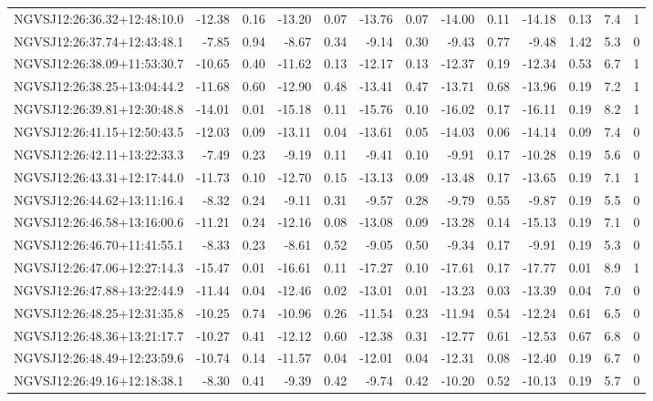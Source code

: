 \begin{tabular}{lrrrrrrrrrrcc}
NGVSJ12:26:36.32+12:48:10.0 & -12.38 & 0.16 & -13.20 & 0.07 & -13.76 & 0.07 & -14.00 & 0.11 & -14.18 & 0.13 & 7.4 & 1 \\
NGVSJ12:26:37.74+12:43:48.1 & -7.85 & 0.94 & -8.67 & 0.34 & -9.14 & 0.30 & -9.43 & 0.77 & -9.48 & 1.42 & 5.3 & 0 \\
NGVSJ12:26:38.09+11:53:30.7 & -10.65 & 0.40 & -11.62 & 0.13 & -12.17 & 0.13 & -12.37 & 0.19 & -12.34 & 0.53 & 6.7 & 1 \\
NGVSJ12:26:38.25+13:04:44.2 & -11.68 & 0.60 & -12.90 & 0.48 & -13.41 & 0.47 & -13.71 & 0.68 & -13.96 & 0.19 & 7.2 & 1 \\
NGVSJ12:26:39.81+12:30:48.8 & -14.01 & 0.01 & -15.18 & 0.11 & -15.76 & 0.10 & -16.02 & 0.17 & -16.11 & 0.19 & 8.2 & 1 \\
NGVSJ12:26:41.15+12:50:43.5 & -12.03 & 0.09 & -13.11 & 0.04 & -13.61 & 0.05 & -14.03 & 0.06 & -14.14 & 0.09 & 7.4 & 0 \\
NGVSJ12:26:42.11+13:22:33.3 & -7.49 & 0.23 & -9.19 & 0.11 & -9.41 & 0.10 & -9.91 & 0.17 & -10.28 & 0.19 & 5.6 & 0 \\
NGVSJ12:26:43.31+12:17:44.0 & -11.73 & 0.10 & -12.70 & 0.15 & -13.13 & 0.09 & -13.48 & 0.17 & -13.65 & 0.19 & 7.1 & 1 \\
NGVSJ12:26:44.62+13:11:16.4 & -8.32 & 0.24 & -9.11 & 0.31 & -9.57 & 0.28 & -9.79 & 0.55 & -9.87 & 0.19 & 5.5 & 0 \\
NGVSJ12:26:46.58+13:16:00.6 & -11.21 & 0.24 & -12.16 & 0.08 & -13.08 & 0.09 & -13.28 & 0.14 & -15.13 & 0.19 & 7.1 & 0 \\
NGVSJ12:26:46.70+11:41:55.1 & -8.33 & 0.23 & -8.61 & 0.52 & -9.05 & 0.50 & -9.34 & 0.17 & -9.91 & 0.19 & 5.3 & 0 \\
NGVSJ12:26:47.06+12:27:14.3 & -15.47 & 0.01 & -16.61 & 0.11 & -17.27 & 0.10 & -17.61 & 0.17 & -17.77 & 0.01 & 8.9 & 1 \\
NGVSJ12:26:47.88+13:22:44.9 & -11.44 & 0.04 & -12.46 & 0.02 & -13.01 & 0.01 & -13.23 & 0.03 & -13.39 & 0.04 & 7.0 & 0 \\
NGVSJ12:26:48.25+12:31:35.8 & -10.25 & 0.74 & -10.96 & 0.26 & -11.54 & 0.23 & -11.94 & 0.54 & -12.24 & 0.61 & 6.5 & 0 \\
NGVSJ12:26:48.36+13:21:17.7 & -10.27 & 0.41 & -12.12 & 0.60 & -12.38 & 0.31 & -12.77 & 0.61 & -12.53 & 0.67 & 6.8 & 0 \\
NGVSJ12:26:48.49+12:23:59.6 & -10.74 & 0.14 & -11.57 & 0.04 & -12.01 & 0.04 & -12.31 & 0.08 & -12.40 & 0.19 & 6.7 & 0 \\
NGVSJ12:26:49.16+12:18:38.1 & -8.30 & 0.41 & -9.39 & 0.42 & -9.74 & 0.42 & -10.20 & 0.52 & -10.13 & 0.19 & 5.7 & 0 \\

\end{tabular}
